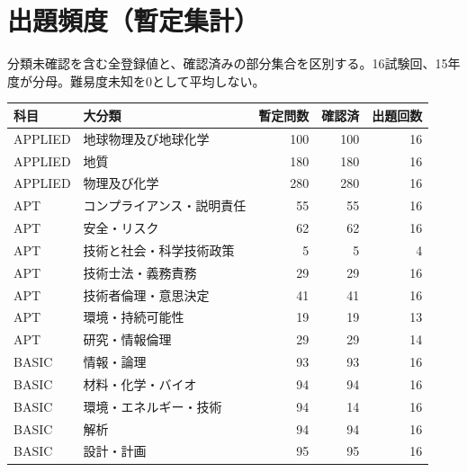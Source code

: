 \chapter{出題頻度（暫定集計）}
分類未確認を含む全登録値と、確認済みの部分集合を区別する。16試験回、15年度が分母。難易度未知を0として平均しない。
\begin{longtable}{p{.16\linewidth}p{.42\linewidth}rrr}
科目 & 大分類 & 暫定問数 & 確認済 & 出題回数\\\hline
APPLIED & 地球物理及び地球化学 & 100 & 100 & 16\\
APPLIED & 地質 & 180 & 180 & 16\\
APPLIED & 物理及び化学 & 280 & 280 & 16\\
APT & コンプライアンス・説明責任 & 55 & 55 & 16\\
APT & 安全・リスク & 62 & 62 & 16\\
APT & 技術と社会・科学技術政策 & 5 & 5 & 4\\
APT & 技術士法・義務責務 & 29 & 29 & 16\\
APT & 技術者倫理・意思決定 & 41 & 41 & 16\\
APT & 環境・持続可能性 & 19 & 19 & 13\\
APT & 研究・情報倫理 & 29 & 29 & 14\\
BASIC & 情報・論理 & 93 & 93 & 16\\
BASIC & 材料・化学・バイオ & 94 & 94 & 16\\
BASIC & 環境・エネルギー・技術 & 94 & 14 & 16\\
BASIC & 解析 & 94 & 94 & 16\\
BASIC & 設計・計画 & 95 & 95 & 16\\
\end{longtable}

